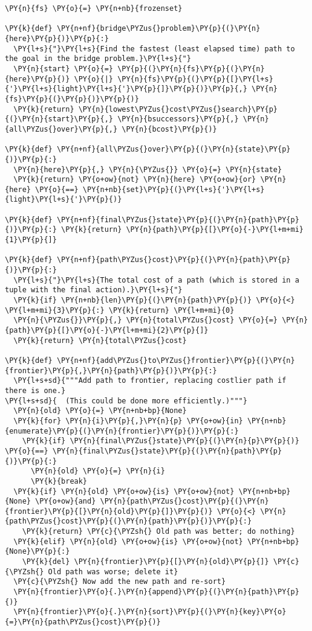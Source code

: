 \begin{Verbatim}[commandchars=\\\{\}]
\PY{n}{fs} \PY{o}{=} \PY{n+nb}{frozenset}

\PY{k}{def} \PY{n+nf}{bridge\PYZus{}problem}\PY{p}{(}\PY{n}{here}\PY{p}{)}\PY{p}{:}
  \PY{l+s}{"}\PY{l+s}{Find the fastest (least elapsed time) path to the goal in the bridge problem.}\PY{l+s}{"}
  \PY{n}{start} \PY{o}{=} \PY{p}{(}\PY{n}{fs}\PY{p}{(}\PY{n}{here}\PY{p}{)} \PY{o}{|} \PY{n}{fs}\PY{p}{(}\PY{p}{[}\PY{l+s}{'}\PY{l+s}{light}\PY{l+s}{'}\PY{p}{]}\PY{p}{)}\PY{p}{,} \PY{n}{fs}\PY{p}{(}\PY{p}{)}\PY{p}{)}
  \PY{k}{return} \PY{n}{lowest\PYZus{}cost\PYZus{}search}\PY{p}{(}\PY{n}{start}\PY{p}{,} \PY{n}{bsuccessors}\PY{p}{,} \PY{n}{all\PYZus{}over}\PY{p}{,} \PY{n}{bcost}\PY{p}{)}

\PY{k}{def} \PY{n+nf}{all\PYZus{}over}\PY{p}{(}\PY{n}{state}\PY{p}{)}\PY{p}{:}
  \PY{n}{here}\PY{p}{,} \PY{n}{\PYZus{}} \PY{o}{=} \PY{n}{state}
  \PY{k}{return} \PY{o+ow}{not} \PY{n}{here} \PY{o+ow}{or} \PY{n}{here} \PY{o}{==} \PY{n+nb}{set}\PY{p}{(}\PY{l+s}{'}\PY{l+s}{light}\PY{l+s}{'}\PY{p}{)}

\PY{k}{def} \PY{n+nf}{final\PYZus{}state}\PY{p}{(}\PY{n}{path}\PY{p}{)}\PY{p}{:} \PY{k}{return} \PY{n}{path}\PY{p}{[}\PY{o}{-}\PY{l+m+mi}{1}\PY{p}{]}

\PY{k}{def} \PY{n+nf}{path\PYZus{}cost}\PY{p}{(}\PY{n}{path}\PY{p}{)}\PY{p}{:}
  \PY{l+s}{"}\PY{l+s}{The total cost of a path (which is stored in a tuple with the final action).}\PY{l+s}{"}
  \PY{k}{if} \PY{n+nb}{len}\PY{p}{(}\PY{n}{path}\PY{p}{)} \PY{o}{<} \PY{l+m+mi}{3}\PY{p}{:} \PY{k}{return} \PY{l+m+mi}{0}
  \PY{n}{\PYZus{}}\PY{p}{,} \PY{n}{total\PYZus{}cost} \PY{o}{=} \PY{n}{path}\PY{p}{[}\PY{o}{-}\PY{l+m+mi}{2}\PY{p}{]}
  \PY{k}{return} \PY{n}{total\PYZus{}cost}

\PY{k}{def} \PY{n+nf}{add\PYZus{}to\PYZus{}frontier}\PY{p}{(}\PY{n}{frontier}\PY{p}{,}\PY{n}{path}\PY{p}{)}\PY{p}{:}
  \PY{l+s+sd}{"""Add path to frontier, replacing costlier path if there is one.}
\PY{l+s+sd}{  (This could be done more efficiently.)"""}
  \PY{n}{old} \PY{o}{=} \PY{n+nb+bp}{None}
  \PY{k}{for} \PY{n}{i}\PY{p}{,}\PY{n}{p} \PY{o+ow}{in} \PY{n+nb}{enumerate}\PY{p}{(}\PY{n}{frontier}\PY{p}{)}\PY{p}{:}
    \PY{k}{if} \PY{n}{final\PYZus{}state}\PY{p}{(}\PY{n}{p}\PY{p}{)} \PY{o}{==} \PY{n}{final\PYZus{}state}\PY{p}{(}\PY{n}{path}\PY{p}{)}\PY{p}{:}
      \PY{n}{old} \PY{o}{=} \PY{n}{i}
      \PY{k}{break}
  \PY{k}{if} \PY{n}{old} \PY{o+ow}{is} \PY{o+ow}{not} \PY{n+nb+bp}{None} \PY{o+ow}{and} \PY{n}{path\PYZus{}cost}\PY{p}{(}\PY{n}{frontier}\PY{p}{[}\PY{n}{old}\PY{p}{]}\PY{p}{)} \PY{o}{<} \PY{n}{path\PYZus{}cost}\PY{p}{(}\PY{n}{path}\PY{p}{)}\PY{p}{:}
    \PY{k}{return} \PY{c}{\PYZsh{} Old path was better; do nothing}
  \PY{k}{elif} \PY{n}{old} \PY{o+ow}{is} \PY{o+ow}{not} \PY{n+nb+bp}{None}\PY{p}{:}
    \PY{k}{del} \PY{n}{frontier}\PY{p}{[}\PY{n}{old}\PY{p}{]} \PY{c}{\PYZsh{} Old path was worse; delete it}
  \PY{c}{\PYZsh{} Now add the new path and re-sort}
  \PY{n}{frontier}\PY{o}{.}\PY{n}{append}\PY{p}{(}\PY{n}{path}\PY{p}{)}
  \PY{n}{frontier}\PY{o}{.}\PY{n}{sort}\PY{p}{(}\PY{n}{key}\PY{o}{=}\PY{n}{path\PYZus{}cost}\PY{p}{)}


\end{Verbatim}
